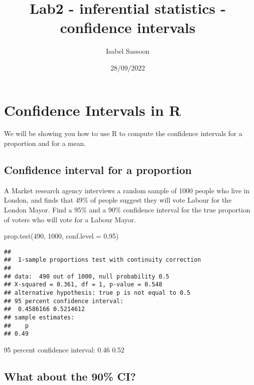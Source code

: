 \documentclass[
]{article}
\title{Lab2 - inferential statistics - confidence intervals}
\author{Isabel Sassoon}
\date{28/09/2022}
\newenvironment{Shaded}{\begin{snugshade}}{\end{snugshade}}
\newcommand{\AttributeTok}[1]{\textcolor[rgb]{0.77,0.63,0.00}{#1}}
\newcommand{\DecValTok}[1]{\textcolor[rgb]{0.00,0.00,0.81}{#1}}
\newcommand{\FloatTok}[1]{\textcolor[rgb]{0.00,0.00,0.81}{#1}}
\newcommand{\FunctionTok}[1]{\textcolor[rgb]{0.00,0.00,0.00}{#1}}
\newcommand{\NormalTok}[1]{#1}
\begin{document}
\maketitle

\hypertarget{confidence-intervals-in-r}{%
\section{Confidence Intervals in R}\label{confidence-intervals-in-r}}

We will be showing you how to use R to compute the confidence intervals
for a proportion and for a mean.

\hypertarget{confidence-interval-for-a-proportion}{%
\subsection{Confidence interval for a
proportion}\label{confidence-interval-for-a-proportion}}

A Market research agency interviews a random sample of 1000 people who
live in London, and finds that 49\% of people suggest they will vote
Labour for the London Mayor. Find a 95\% and a 90\% confidence interval
for the true proportion of voters who will vote for a Labour Mayor.

\begin{Shaded}
\begin{Highlighting}[]
\FunctionTok{prop.test}\NormalTok{(}\DecValTok{490}\NormalTok{, }\DecValTok{1000}\NormalTok{, }\AttributeTok{conf.level =} \FloatTok{0.95}\NormalTok{)}
\end{Highlighting}
\end{Shaded}

\begin{verbatim}
## 
##  1-sample proportions test with continuity correction
## 
## data:  490 out of 1000, null probability 0.5
## X-squared = 0.361, df = 1, p-value = 0.548
## alternative hypothesis: true p is not equal to 0.5
## 95 percent confidence interval:
##  0.4586166 0.5214612
## sample estimates:
##    p 
## 0.49
\end{verbatim}

95 percent confidence interval: 0.46 0.52

\hypertarget{what-about-the-90-ci}{%
\subsection{What about the 90\% CI?}\label{what-about-the-90-ci}}
\end{document}
